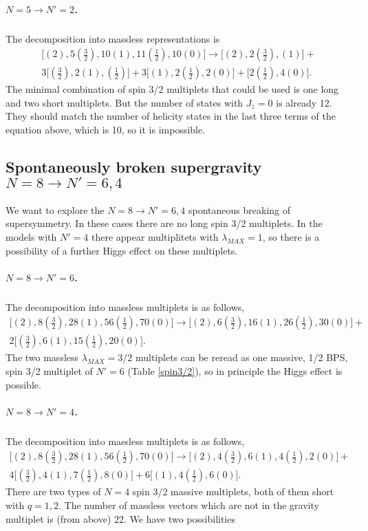 \documentclass[a4paper,12pt]{article}
\begin{document}
\subparagraph{$N=5\rightarrow N'=2$.}The decomposition into massless representations is
\begin{eqnarray*}\bigl[ (2), 5(\frac{3}{2}), 10 (1), 11(\frac{1}{2}), 10(0)\bigr]\rightarrow
\bigl[ (2), 2(\frac{3}{2}), (1)\bigr]+\\ 3\bigl[ (\frac{3}{2}),
2(1), (\frac{1}{2})\bigr]+3\bigl[ (1), 2(\frac{1}{2}), 2(0)\bigr]+
\bigl[ 2(\frac{1}{2}), 4(0)\bigr].\end{eqnarray*} The minimal
combination of spin 3/2 multiplets that could be used is one long
and two short multiplets. But the number of states with  $J_z=0$
is already 12. They should match the number of helicity states in
the last three terms of the equation above, which is 10, so it is
impossible.

\subsection{Spontaneously broken  supergravity $N=8\rightarrow N'=6,4$
 \label{8to64}} We want to explore the $N=8\rightarrow N'=6,4$ spontaneous breaking of supersymmetry.
  In these cases there are no long spin 3/2 multiplets. In the models with $N'=4$ there
  appear multiplitets with $\lambda_{MAX}=1$, so there is a possibility of a further Higgs effect on these multiplets.

\subparagraph{$N=8\rightarrow N'=6$.}The decomposition into massless multiplets is as follows,
\begin{eqnarray*}\bigl[ (2), 8(\frac{3}{2}), 28 (1), 56(\frac{1}{2}), 70(0)\bigr]\rightarrow
\bigl[ (2), 6(\frac{3}{2}), 16(1),26(\frac{1}{2}), 30(0)\bigr]+\\
2\bigl[ (\frac{3}{2}), 6(1), 15(\frac{1}{2}),
20(0)\bigr].\end{eqnarray*} The two massless $\lambda_{MAX}=3/2$
multiplets can be reread as one massive, 1/2 BPS,  spin 3/2
multiplet of $N'=6$ (Table \ref{spin3/2}), so in principle the
Higgs effect is possible.

\subparagraph{$N=8\rightarrow N'=4$.}The decomposition into massless multiplets is as follows,
\begin{eqnarray*}\bigl[ (2), 8(\frac{3}{2}), 28 (1), 56(\frac{1}{2}), 70(0)\bigr]\rightarrow
\bigl[ (2), 4(\frac{3}{2}), 6(1),4(\frac{1}{2}), 2(0)\bigr]+\\
4\bigl[ (\frac{3}{2}), 4(1), 7(\frac{1}{2}), 8(0)\bigr]+6\bigl[
(1), 4(\frac{1}{2}), 6(0)\bigr].\end{eqnarray*} There are two
types of $N=4$ spin 3/2 massive multiplets, both of them short
with $q=1,2$. The number of massless vectors which are not in the
gravity multiplet  is (from above) 22. We have two possibilities
\end{document}
